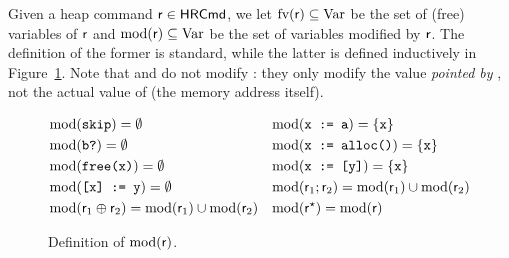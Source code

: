 Given a heap command $\mathsf{r} \in \mathsf{HRCmd}$, we let $\text{fv}(\mathsf{r}) \subseteq \text{Var}$ be the set of (free) variables of $\mathsf{r}$ and $\text{mod}(\mathsf{r}) \subseteq \text{Var}$ be the set of variables modified by $\mathsf{r}$. The definition of the former is standard, while the latter is defined inductively in Figure~\ref{fig:sil:regh-mod-def}. Note that  and  do not modify : they only modify the value \emph{pointed by} , not the actual value of  (the memory address itself).

\begin{figure}[t]
	\begin{align*}
		 & \text{mod}(\texttt{skip}) = \emptyset \qquad                                        &  & \text{mod}(\texttt{x := a}) = \{ \texttt{x} \}                                \\
		 & \text{mod}(\texttt{b?}) = \emptyset \qquad                                          &  & \text{mod}(\texttt{x := alloc()}) = \{ \texttt{x} \}                          \\
		 & \text{mod}(\texttt{free(x)}) = \emptyset \qquad                                     &  & \text{mod}(\texttt{x := [y]}) = \{ \texttt{x} \}                              \\
		 & \text{mod}(\texttt{[x] := y}) = \emptyset                                           &  & \text{mod}(\mathsf{r}_1; \mathsf{r}_2) = \text{mod}(\mathsf{r}_1) \cup \text{mod}(\mathsf{r}_2) \\
		 & \text{mod}(\mathsf{r}_1 \oplus \mathsf{r}_2) = \text{mod}(\mathsf{r}_1) \cup \text{mod}(\mathsf{r}_2) &  & \text{mod}(\mathsf{r}^{\star}) = \text{mod}(\mathsf{r})
	\end{align*}
	\caption{Definition of $\text{mod}(\mathsf{r})$.}
	\label{fig:sil:regh-mod-def}
\end{figure}

